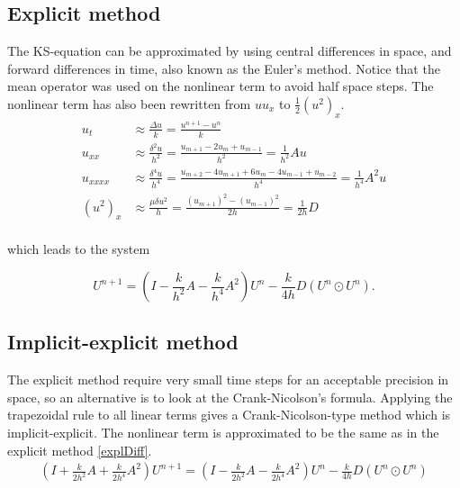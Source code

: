 \subsection{Explicit method}
The KS-equation can be approximated by using central differences in space, and forward differences in time, also known as the Euler's method. Notice that the mean operator was used on the nonlinear term to avoid half space steps.    The nonlinear term has also been rewritten from $uu_x$ to $\frac{1}{2}(u^2)_x$.
\begin{equation*}
\begin{aligned}
u_t &\approx \frac{\Delta u}{k} = \frac{u^{n+1}-u^n}{k} \\
u_{xx} &\approx \frac{\delta^2 u}{h^2} = \frac{u_{m+1}-2u_{m}+u_{m-1}}{h^2} = \frac{1}{h^2}Au \\
u_{xxxx} &\approx \frac{\delta^4 u}{h^4} = \frac{u_{m+2}-4u_{m+1}+6u_m-4u_{m-1}+u_{m-2}}{h^4} = \frac{1}{h^4}A^2u\\
(u^2)_{x} &\approx \frac{\mu \delta u^2}{h} = \frac{(u_{m+1})^2-(u_{m-1})^2}{2h} = \frac{1}{2h}D\\
\end{aligned}
\end{equation*}

which leads to the system

\begin{equation}
\label{explDiff}
U^{n+1} = (I - \frac{k}{h^2}A - \frac{k}{h^4}A^2)U^n - \frac{k}{4h}D(U^{n}\odot U^n).
\end{equation}

\subsection{Implicit-explicit method}
The explicit method require very small time steps for an acceptable precision in space, so an alternative is to look at the Crank-Nicolson's formula. Applying the trapezoidal rule to all linear terms gives a Crank-Nicolson-type method which is implicit-explicit. The nonlinear term is approximated to be the same as in the explicit method \eqref{explDiff}.
\begin{align}
\label{implDiff}
(I + \frac{k}{2h^2}A + \frac{k}{2h^4}A^2)U^{n+1}
= (I - \frac{k}{2h^2}A - \frac{k}{2h^4}A^2)U^n - \frac{k}{4h}D(U^{n}\odot U^n)
\end{align}


